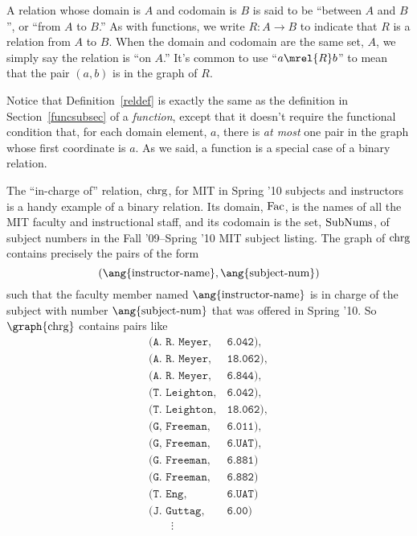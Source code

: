 A relation whose domain is $A$ and codomain is $B$ is said to be ``between
$A$ and $B$'', or ``from $A$ to $B$.''  As with functions, we write $R: A
\to B$ to indicate that $R$ is a relation from $A$ to $B$.  When the
domain and codomain are the same set, $A$, we simply say the
 relation is ``on $A$.''  It's common to use
 ``$a \mrel{R} b$'' to mean that the pair $(a,b)$ is
in the graph of $R$.

Notice that Definition~\ref{reldef} is exactly the same as the definition
in Section~\ref{funcsubsec} of a {\emph{function}}, except that it doesn't
require the functional condition that, for each domain element, $a$, there
is \emph{at most} one pair in the graph whose first coordinate is $a$.  As
we said, a function is a special case of a binary relation.

The ``in-charge of'' relation, $\text{chrg}$, for MIT in Spring '10 subjects
and instructors is a handy example of a binary relation.  Its domain,
$\text{Fac}$, is the names of all the MIT faculty and instructional staff,
and its codomain is the set, $\text{SubNums}$, of subject numbers in the
Fall '09--Spring '10 MIT subject listing.  The graph of $\text{chrg}$ contains
precisely the pairs of the form
\[
(\ang{\text{instructor-name}}, \ang{\text{subject-num}})
\]
such that the faculty member named $\ang{\text{instructor-name}}$ is in
charge of the subject with number $\ang{\text{subject-num}}$ that was
offered in Spring '10.  So $\graph{\inchrg}$ contains pairs like
\[\begin{array}{ll}
(\texttt{A. R. Meyer}, & \texttt{6.042}),\\
(\texttt{A. R. Meyer}, & \texttt{18.062}),\\
(\texttt{A. R. Meyer}, & \texttt{6.844}),\\
(\texttt{T. Leighton}, & \texttt{6.042}),\\
(\texttt{T. Leighton}, & \texttt{18.062}),\\
(\texttt{G, Freeman}, & \texttt{6.011}),\\
(\texttt{G, Freeman}, & \texttt{6.UAT}),\\
(\texttt{G. Freeman}, & \texttt{6.881})\\
(\texttt{G. Freeman}, & \texttt{6.882})\\
(\texttt{T. Eng},      & \texttt{6.UAT})\\
(\texttt{J. Guttag},  & \texttt{6.00})\\
\qquad \vdots
\end{array}\]

